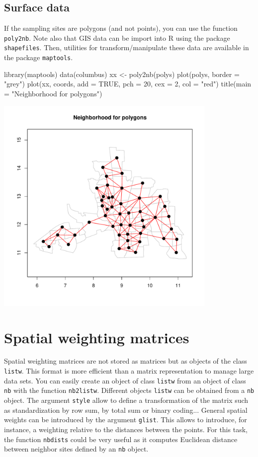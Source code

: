 \documentclass[a4paper]{article}
\begin{document}
\subsection{Surface data}
If the sampling sites are polygons (and not points), you can use the function \texttt{poly2nb}. Note also that GIS data can be import into R using the package \texttt{shapefiles}. Then, utilities for transform/manipulate these data are available in the package \texttt{maptools}.
\begin{Schunk}
\begin{Sinput}
 library(maptools)
 data(columbus)
 xx <- poly2nb(polys)
 plot(polys, border = "grey")
 plot(xx, coords, add = TRUE, pch = 20, cex = 2, col = "red")
 title(main = "Neighborhood for polygons")
\end{Sinput}
\end{Schunk}
\begin{center}
\includegraphics[width=0.8\textwidth,keepaspectratio]{figs/tutorial-ni16}
\end{center}
\section{Spatial weighting matrices}
Spatial weighting matrices are not stored as matrices but as objects of the class \texttt{listw}. This format is more efficient than a matrix representation to manage large data sets. You can easily create an object of class \texttt{listw} from an object of class \texttt{nb} with the function \texttt{nb2listw}.
Different objects \texttt{listw} can be obtained from a \texttt{nb} object. The argument \texttt{style} allow to define a transformation of the matrix such as standardization by row sum, by total sum or binary coding... General spatial weights can be introduced by the argument \texttt{glist}. This allows to introduce, for instance, a weighting relative to the distances between the points. For this task, the function \texttt{nbdists} could be very useful as it computes Euclidean distance between neighbor sites defined by an \texttt{nb} object.
\end{document}
